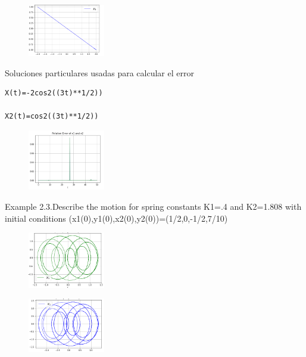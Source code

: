 \documentclass[a4paper]{article}
\begin{document}
\begin{figure}[ht!]
\centering
\includegraphics[width=0.3\textwidth]{2_2_2.png}
\end{figure}

\newpage

Soluciones particulares usadas para calcular el error 

\begin{verbatim}
X(t)=-2cos2((3t)**1/2))

X2(t)=cos2((3t)**1/2))
\end{verbatim}


\begin{figure}[ht!]
\centering
\includegraphics[width=0.3\textwidth]{2_2_3.png}
\end{figure}


Example 2.3.Describe the motion for spring constants K1=.4 and K2=1.808 with initial conditions (x1(0),y1(0),x2(0),y2(0))=(1/2,0,-1/2,7/10)  

\begin{figure}[ht!]
\centering
\includegraphics[width=0.3\textwidth]{2_3_1.png}
\end{figure}

\begin{figure}[ht!]
\centering
\includegraphics[width=0.3\textwidth]{2_3_2.png}
\end{figure}
\end{document}
